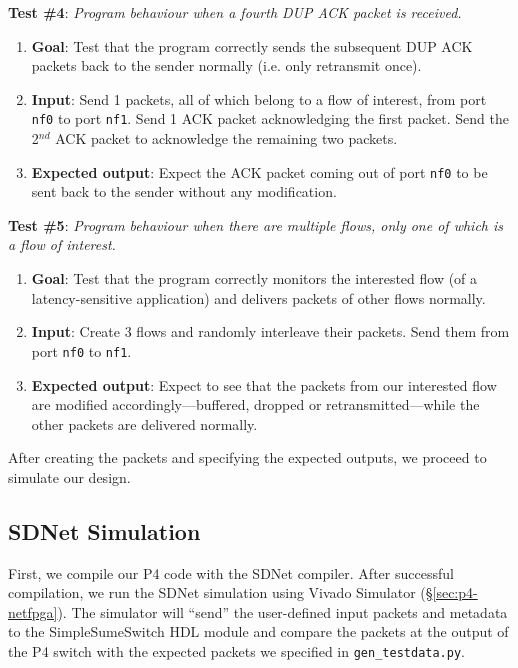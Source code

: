 \textbf{Test \#4}: \textit{Program behaviour when a fourth DUP ACK packet is received.}
\begin{enumerate}[label*=\arabic*.,leftmargin=*, noitemsep]
	\item \textbf{Goal}: Test that the program correctly sends the subsequent DUP ACK packets back to the sender normally (i.e. only retransmit once).
	\item \textbf{Input}: Send 1 packets, all of which belong to a flow of interest, from port \verb|nf0| to port \verb|nf1|. Send 1 ACK packet acknowledging the first packet. Send the 2$^{nd}$ ACK packet to acknowledge the remaining two packets.
	\item \textbf{Expected output}: Expect the ACK packet coming out of port \verb|nf0| to be sent back to the sender without any modification.
\end{enumerate}

\textbf{Test \#5}: \textit{Program behaviour when there are multiple flows, only one of which is a flow of interest.}
\begin{enumerate}[label*=\arabic*.,leftmargin=*, noitemsep]
	\item \textbf{Goal}: Test that the program correctly monitors the interested flow (of a latency-sensitive application) and delivers packets of other flows normally.
	\item \textbf{Input}: Create 3 flows and randomly interleave their packets. Send them from port \verb|nf0| to \verb|nf1|.
	\item \textbf{Expected output}: Expect to see that the packets from our interested flow are modified accordingly---buffered, dropped or retransmitted---while the other packets are delivered normally.
\end{enumerate}

After creating the packets and specifying the expected outputs, we proceed to simulate our design.

\subsection{SDNet Simulation}
First, we compile our P4 code with the SDNet compiler. After successful compilation, we run the SDNet simulation using Vivado Simulator (\S\ref{sec:p4-netfpga}). The simulator will ``send'' the user-defined input packets and metadata to the SimpleSumeSwitch HDL module and compare the packets at the output of the P4 switch with the expected packets we specified in \verb|gen_testdata.py|.

